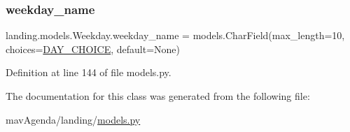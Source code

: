 \mbox{\label{classlanding_1_1models_1_1Weekday_abf96c7b22336690bfb2fedd04a422ea2}} 
\subsubsection{\texorpdfstring{weekday\+\_\+name}{weekday\_name}}
{\footnotesize\ttfamily landing.\+models.\+Weekday.\+weekday\+\_\+name = models.\+Char\+Field(max\+\_\+length=10, choices=\mbox{\hyperlink{classlanding_1_1models_1_1Weekday_a7087116a99b548d0bfb99890d31b377a}{D\+A\+Y\+\_\+\+C\+H\+O\+I\+CE}}, default=None)\hspace{0.3cm}{\ttfamily [static]}}



Definition at line 144 of file models.\+py.



The documentation for this class was generated from the following file\+:\begin{DoxyCompactItemize}
\item 
mav\+Agenda/landing/\mbox{\hyperlink{models_8py}{models.\+py}}\end{DoxyCompactItemize}
